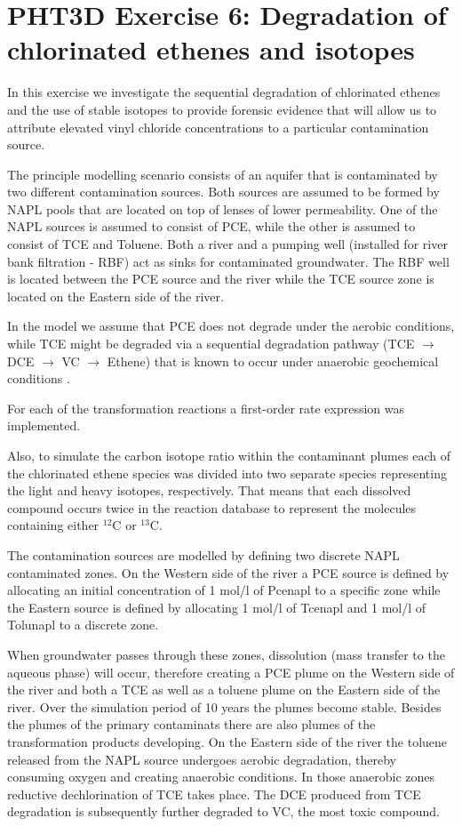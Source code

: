 \newpage
\noident
\section[PHT3D Exercise 6: Degradation of chlorinated ethenes and isotopes]{PHT3D Exercise 6: Degradation of chlorinated ethenes and isotopes}

In this exercise we investigate the sequential degradation of chlorinated ethenes and the use of 
stable isotopes to provide forensic evidence that will allow us to attribute elevated vinyl chloride concentrations to a particular contamination source.   



The principle modelling scenario consists of an aquifer that is contaminated by two different contamination sources. Both sources are assumed to be formed by NAPL pools that are located on top of lenses of lower permeability. One of the NAPL sources is assumed to consist of PCE, while the other is assumed to consist of TCE and Toluene. Both a river and a pumping well (installed for river bank filtration - RBF) act as sinks for contaminated groundwater. The RBF well is located between the PCE source and the river while the TCE source zone is located on the Eastern side of the river.

In the model we assume that PCE does not degrade under the aerobic conditions, 
while TCE might be degraded via a sequential degradation 
pathway (TCE $\rightarrow$ DCE $\rightarrow$ VC $\rightarrow$ Ethene) that is known to occur 
under anaerobic geochemical conditions . 

For each of the transformation reactions a first-order rate expression was implemented.

Also, to simulate the carbon isotope ratio within the contaminant plumes each of the 
chlorinated ethene species was divided into two separate species representing the light and
heavy isotopes, respectively.
That means that each dissolved compound occurs twice in the reaction database to represent the 
molecules containing either $^{12}$C or $^{13}$C. 

The contamination sources are modelled by defining two discrete NAPL contaminated zones.
On the Western side of the river a PCE source is defined by allocating an initial 
concentration of 1 mol/l of Pcenapl to a specific zone while the Eastern source
is defined by allocating 1 mol/l of Tcenapl and 1 mol/l of Tolunapl to a discrete zone.

When groundwater passes through these zones, dissolution (mass transfer to the aqueous phase) will
occur, therefore creating a PCE plume on the Western side of the river and both a TCE as well as a toluene 
plume on the Eastern side of the river. Over the simulation period of 10 years the plumes
become stable. Besides the plumes of the primary contaminats there are also plumes of the 
transformation products developing. On the Eastern side of the river the toluene released from the NAPL source
undergoes aerobic degradation, thereby consuming oxygen and creating anaerobic conditions.
In those anaerobic zones reductive dechlorination of TCE takes place. The DCE produced from TCE degradation
is subsequently further degraded to VC, the most toxic compound. 

